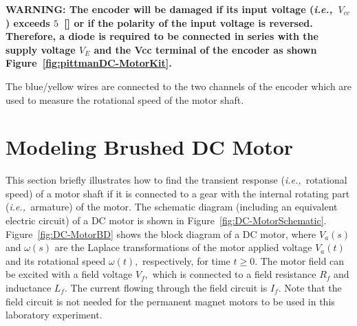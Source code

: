 %
\begin{mdframed}[roundcorner=10pt,backgroundcolor=yellow!50]
  {\bf WARNING: The encoder will be damaged if its input voltage (\textit{i.e.,}~$V_{cc}$) exceeds $5$~[\volt] or if the polarity of the input voltage is reversed. Therefore, a diode is required to be connected in series with the supply voltage $V_E$  and the Vcc terminal of the encoder as shown Figure~\ref{fig:pittmanDC-MotorKit}.} 
\end{mdframed}
%
The blue/yellow wires are connected to the two channels of the encoder which are used to measure the rotational speed of the motor shaft.  

\section{Modeling Brushed DC Motor}
\label{sec:motorModeling}
This section briefly illustrates  how to find the transient response (\textit{i.e.,~}rotational speed)  of a motor shaft if it is connected to a gear with the internal rotating part  (\textit{i.e.,~}armature) of the motor. The schematic diagram (including an equivalent electric circuit) of a DC motor is shown in Figure~\ref{fig:DC-MotorSchematic}. Figure~\ref{fig:DC-MotorBD} shows the block diagram of a DC motor, where $V_a(s)$ and $\omega(s)$ are the Laplace transformations of the motor applied voltage $V_a(t)$ and its rotational speed $\omega(t),$ respectively,  for time $t\ge 0.$ The motor field can be excited with a field voltage $V_f,$ which is connected to a field resistance $R_f$ and inductance $L_f.$ The current flowing through the field circuit is $I_f.$ Note that the field circuit is not needed for the permanent magnet motors to be used in this laboratory experiment. %
%
